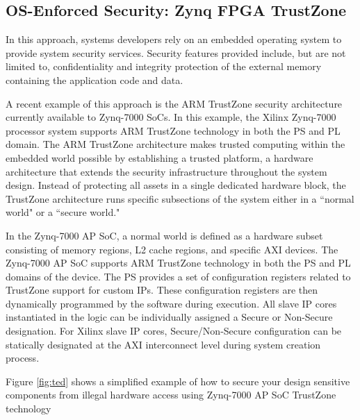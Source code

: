 \documentclass[sigconf]{acmart}
\theoremstyle{plain}
\theoremstyle{remark}
\begin{document}
\subsection{OS-Enforced Security: Zynq FPGA TrustZone}

In this approach, systems developers rely on an embedded operating system to provide system security services. Security features provided include, but are not limited to, confidentiality and integrity protection of the external memory containing the application code and data.

A recent example of this approach is the ARM TrustZone security architecture currently available to Zynq-7000 SoCs. In this example, the Xilinx Zynq-7000 processor system supports ARM TrustZone technology in both the PS and PL domain. The ARM TrustZone architecture makes trusted computing within the embedded world possible by establishing a trusted platform, a hardware architecture that extends the security infrastructure throughout the system design. Instead of protecting all assets in a single dedicated hardware block, the TrustZone architecture runs specific subsections of the system either in a ``normal world" or a ``secure world."

In the Zynq-7000 AP SoC, a normal world is defined as a hardware subset consisting of memory regions, L2 cache regions, and specific AXI devices. The Zynq-7000 AP SoC supports ARM TrustZone technology in both the PS and PL domains of the device. The PS provides a set of configuration registers related to TrustZone support for custom IPs. These configuration registers are then dynamically programmed by the software during execution. All slave IP cores instantiated in the logic can be individually assigned a Secure or Non-Secure designation. For Xilinx slave IP cores, Secure/Non-Secure configuration can be statically designated at the AXI interconnect level during system creation process.

Figure \ref{fig:ted} shows a simplified example of how to secure your design sensitive components from illegal hardware access using Zynq-7000 AP SoC TrustZone technology
\end{document}
